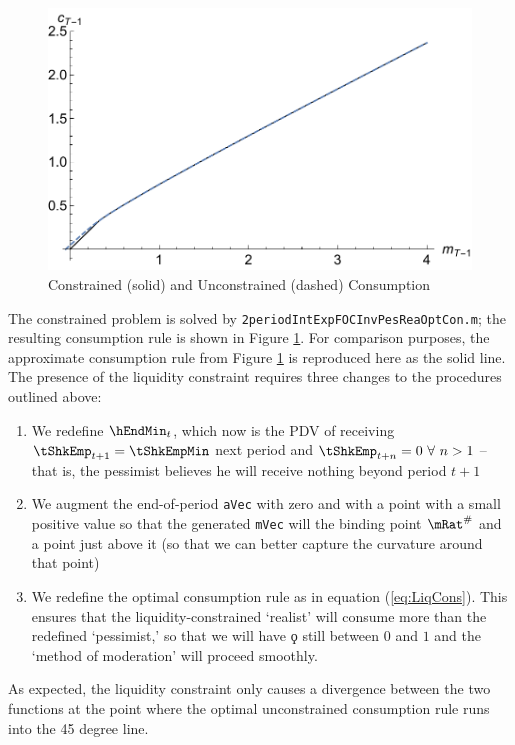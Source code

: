 \documentclass[titlepage]{\econtex}
\begin{document}
\hypertarget{cVScCon}{}
\begin{figure}
  \includegraphics{./Figures/cVScCon}
  \caption{Constrained (solid) and Unconstrained (dashed) Consumption}
  \label{fig:cVScCon}
\end{figure}

The constrained problem is solved by
\texttt{2periodIntExpFOCInvPesReaOptCon.m}; the resulting consumption
rule is shown in Figure \ref{fig:cVScCon}. For comparison purposes,
the approximate consumption rule from Figure \ref{fig:cVScCon} is
reproduced here as the solid line. The presence of the liquidity
constraint requires three changes to the procedures outlined above:
\begin{enumerate}
\item We redefine
  $\hEndMin_{t}$, which now is the PDV of receiving
  $\tShkEmp_{t+1}=\tShkEmpMin$ next period and
  $\tShkEmp_{t+n}=0~\forall~n>1$ -- that is, the pessimist believes he
  will receive nothing beyond period $t+1$
\item We augment the end-of-period \texttt{aVec} with zero and with a point with a small positive value so that the generated 
  \texttt{mVec} will the binding point $\mRat^{\#}$ and a point just above it (so that we can better capture the curvature
  around that point)
\item We redefine the optimal consumption rule as
  in equation (\ref{eq:LiqCons}).  This ensures that the
  liquidity-constrained `realist' will consume more than the redefined
  `pessimist,' so that we will have $\koppa$ still between $0$ and $1$
  and the `method of moderation' will proceed smoothly. 
\end{enumerate}

As expected, the
liquidity constraint only causes a divergence between the two
functions at the point where the optimal unconstrained consumption
rule runs into the 45 degree line.
\end{document}
